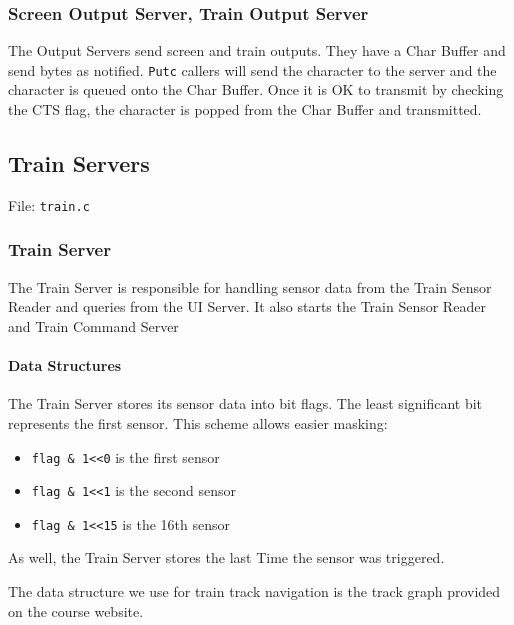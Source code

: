 \documentclass[letterpaper]{article}
\begin{document}
\subsubsection{Screen Output Server, Train Output Server%
  \label{screen-output-server-train-output-server}%
}

The Output Servers send screen and train outputs. They have a Char Buffer and send bytes as notified. \texttt{Putc} callers will send the character to the server and the character is queued onto the Char Buffer. Once it is OK to transmit by checking the CTS flag, the character is popped from the Char Buffer and transmitted.


\subsection{Train Servers%
  \label{train-servers}%
}

File: \texttt{train.c}


\subsubsection{Train Server%
  \label{train-server}%
}

The Train Server is responsible for handling sensor data from the Train Sensor Reader and queries from the UI Server. It also starts the Train Sensor Reader and Train Command Server


\paragraph{Data Structures%
  \label{data-structures}%
}

The Train Server stores its sensor data into bit flags. The least significant bit represents the first sensor. This scheme allows easier masking:
%
\begin{itemize}

\item \texttt{flag \& 1<{}<0} is the first sensor

\item \texttt{flag \& 1<{}<1} is the second sensor

\item \texttt{flag \& 1<{}<15} is the 16th sensor

\end{itemize}

As well, the Train Server stores the last Time the sensor was triggered.

The data structure we use for train track navigation is the track graph provided on the course website.
\end{document}
